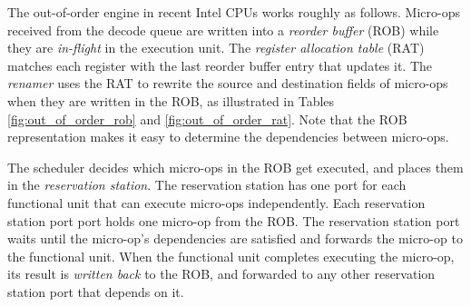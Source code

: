 
The out-of-order engine in recent Intel CPUs works roughly as follows.
Micro-ops received from the decode queue are written into a \textit{reorder
buffer} (ROB) while they are \textit{in-flight} in the execution unit. The
\textit{register allocation table} (RAT) matches each register with the last
reorder buffer entry that updates it. The \textit{renamer} uses the RAT to
rewrite the source and destination fields of micro-ops when they are written in
the ROB, as illustrated in Tables \ref{fig:out_of_order_rob} and
\ref{fig:out_of_order_rat}. Note that the ROB representation makes it easy to
determine the dependencies between micro-ops.

\begin{table}[hbt]
  \caption{
    Data written by the renamer into the reorder buffer (ROB), for the
    micro-ops in Table~\ref{fig:out_of_order_micro_ops}.
  }
  \label{fig:out_of_order_rob}
\end{table}

\begin{table}[hbt]
  \caption{
    Relevant entries of the register allocation table after the micro-ops in
    Table~\ref{fig:out_of_order_micro_ops} are inserted into the ROB.
  }
  \label{fig:out_of_order_rat}
\end{table}


The scheduler decides which micro-ops in the ROB get executed, and places them
in the \textit{reservation station}. The reservation station has one port
for each functional unit that can execute micro-ops independently. Each
reservation station port port holds one micro-op from the ROB. The reservation
station port waits until the micro-op's dependencies are satisfied and forwards
the micro-op to the functional unit. When the functional unit completes
executing the micro-op, its result is \textit{written back} to the ROB, and
forwarded to any other reservation station port that depends on it.

